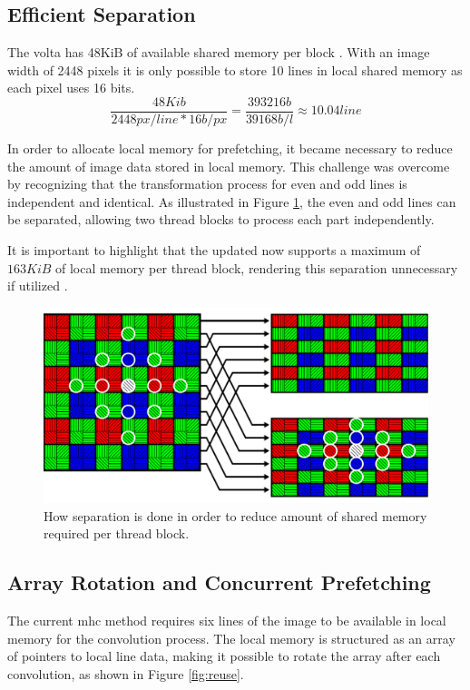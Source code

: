 \subsection{Efficient Separation}
The \gls{volta} has 48KiB of available shared memory per block \cite{rigerunNVIDIAJetsonXavier2023}.
With an image width of 2448 pixels \cite{lucidvisionlabsTriton0MPPolarization} it is only possible to store 10 lines in local shared memory as each pixel uses 16 bits.
\begin{equation*}
    \frac{48Kib}{2448px/line * 16b/px} = \frac{393216b}{39168b/l} \approx 10.04line
\end{equation*}

In order to allocate local memory for prefetching, it became necessary to reduce the amount of image data stored in local memory.
This challenge was overcome by recognizing that the transformation process for even and odd lines is independent and identical.
As illustrated in Figure \ref{fig:saperation}, the even and odd lines can be separated, allowing two thread blocks to process each part independently.

It is important to highlight that the updated \jo now supports a maximum of $163KiB$ of local memory per thread block, rendering this separation unnecessary if utilized \cite{CUDA2023}.
\begin{figure}[H]
    \centering
    \includegraphics[width=\textwidth]{figures/polarized_image/separation.pdf}
    \caption{How separation is done in order to reduce amount of shared memory required per thread block.}
    \label{fig:saperation}
\end{figure}

\subsection{Array Rotation and Concurrent Prefetching}
The current \gls{mhc} method requires six lines of the image to be available in local memory for the convolution process.
The local memory is structured as an array of pointers to local line data, making it possible to rotate the array after each convolution, as shown in Figure \ref{fig:reuse}.

